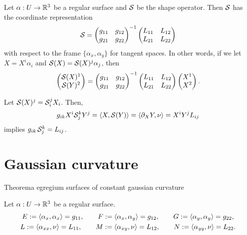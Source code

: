 \documentclass{../../large}
\begin{document}
\begin{thm}
Let $\alpha:U\to\mathbb{R}^3$ be a regular surface and $\mathcal{S}$ be the shape operator.
Then $\mathcal{S}$ has the coordinate representation
\[\mathcal{S}=\begin{pmatrix}g_{11}&g_{12}\\g_{21}&g_{22}\end{pmatrix}^{-1}\begin{pmatrix}L_{11}&L_{12}\\L_{21}&L_{22}\end{pmatrix}\]
with respect to the frame $\{\alpha_x,\alpha_y\}$ for tangent spaces.
In other words, if we let $X=X^i\alpha_i$ and $\mathcal{S}(X)=\mathcal{S}(X)^j\alpha_j$, then
\[\begin{pmatrix}\mathcal{S}(X)^1\\\mathcal{S}(Y)^2\end{pmatrix}=\begin{pmatrix}g_{11}&g_{12}\\g_{21}&g_{22}\end{pmatrix}^{-1}\begin{pmatrix}L_{11}&L_{12}\\L_{21}&L_{22}\end{pmatrix}\begin{pmatrix}X^1\\X^2\end{pmatrix}.\]
\end{thm}
\begin{pf}
Let $\mathcal{S}(X)^j=\mathcal{S}_i^jX_i$.
Then,
\[g_{ik}X^i\cS_j^kY^j=\<X,\cS(Y)\>=\<\pd_XY,\nu\>=X^iY^jL_{ij}\]
implies $g_{ik}\,\mathcal{S}_j^k=L_{ij}$.
\end{pf}

























\chapter{Gaussian curvature}
Theorema egregium
surfaces of constant gaussian curvature


\begin{defn}
Let $\alpha:U\to\mathbb{R}^3$ be a regular surface.
\begin{gather*}
E:=\langle\alpha_x,\alpha_x\rangle=g_{11},\qquad F:=\langle\alpha_x,\alpha_y\rangle=g_{12},\qquad G:=\langle\alpha_y,\alpha_y\rangle=g_{22},\\
L:=\langle\alpha_{xx},\nu\rangle=L_{11},\qquad M:=\langle\alpha_{xy},\nu\rangle=L_{12},\qquad N:=\langle\alpha_{yy},\nu\rangle=L_{22}.
\end{gather*}
\end{defn}
\end{document}
